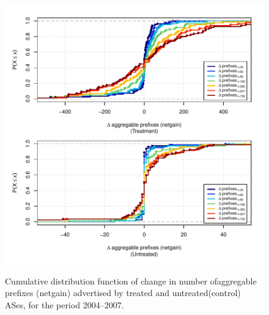 \begin{figure}[H]
\begin{centering}
\begin{singlespace}
    \includegraphics[width=6in]{figures/behavior-netgain-2004_2007-corr.pdf}
    \vspace{-2em}\\
    \caption{Cumulative distribution function of change in number ofaggregable
    prefixes (netgain) advertised by treated and untreated(control) ASes, for
    the period 2004--2007.}
\end{singlespace}
\end{centering}
\end{figure}

